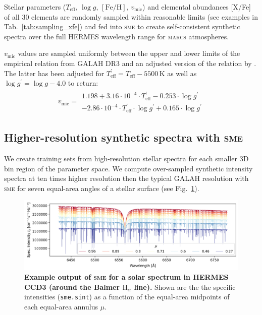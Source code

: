 \documentclass[
  journal=pasa,
  manuscript=research-paper, %
  year=2023,
  volume=37
]{cup-journal}
\newcommand{\Teff}{$T_\mathrm{eff}$\xspace}
\newcommand{\logg}{$\log g$\xspace}
\newcommand{\feh}{$\mathrm{[Fe/H]}$\xspace}
\newcommand{\vmic}{$v_\mathrm{mic}$\xspace}
\newcommand{\sme}{\textsc{sme}\xspace}
\newcommand{\marcs}{\textsc{marcs}\xspace}
\begin{document}
Stellar parameters (\Teff, \logg, \feh, \vmic) and elemental abundances [X/Fe] of all 30 elements are randomly sampled within reasonable limits (see examples in Tab.~\ref{tab:sampling_xfe}) and fed into \sme to create self-consistent synthetic spectra over the full HERMES wavelength range for \marcs atmospheres. 

\vmic values are sampled uniformly between the upper and lower limits of the empirical relation from GALAH DR3 \citep[Eqs.~4 and 5 from][]{Buder2021} and an adjusted version of the relation by \citet{DutraFerreira2016}. The latter has been adjusted for $T_\text{eff}^\prime = T_\text{eff} - 5500\,\mathrm{K}$ as well as $\log g^\prime = \log g - 4.0$ to return:
\begin{align} 
v_\text{mic} = \begin{array}{l}
1.198 + 3.16 \cdot 10^{-4} \cdot T_\text{eff}^\prime - 0.253 \cdot \log g^\prime \\ - 2.86\cdot 10^{-4} \cdot T_\text{eff}^\prime \cdot \log g^\prime + 0.165 \cdot \log g^\prime
\end{array} \label{eq:vmic_initial}
\end{align}

\subsection{Higher-resolution synthetic spectra with \sme}
\label{sec:higher_resolution_synthetic_spectra}

We create training sets from high-resolution stellar spectra for each smaller 3D bin region of the parameter space. We compute over-sampled synthetic intensity spectra at ten times higher resolution then the typical GALAH resolution with \sme for seven equal-area angles of a stellar surface (see Fig.~\ref{fig:sme_mu_output}).

\begin{figure}[hbt]
 \centering
 \includegraphics[width=\textwidth]{figures/solar_twin_specific_intensity.png}
 \caption{\textbf{Example output of \sme for a solar spectrum in HERMES CCD3 (around the Balmer $\mathrm{H}_\alpha$ line).} Shown are the the specific intensities (\texttt{sme.sint}) as a function of the equal-area midpoints of each equal-area annulus $\mu$.}
 \label{fig:sme_mu_output}
\end{figure}
\end{document}

